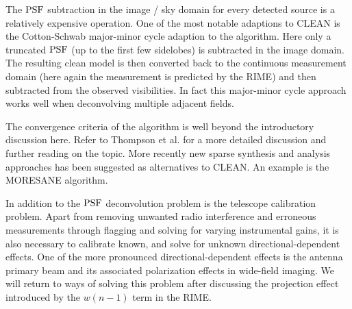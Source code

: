 The $\textrm{PSF}$ subtraction in the image / sky domain for every detected source is a relatively expensive operation. One of the
most notable adaptions to CLEAN is the Cotton-Schwab major-minor cycle adaption to the algorithm. Here only a truncated
$\textrm{PSF}$ (up to the first few sidelobes) is subtracted in the image domain. The resulting clean model is then converted back
to the continuous measurement domain (here again the measurement is predicted by the RIME) and then subtracted from the 
observed visibilities. In fact this major-minor cycle approach works well when deconvolving multiple adjacent fields. 

The convergence criteria of the algorithm is well beyond the introductory discussion here. Refer to Thompson et 
al. \cite[ch 11]{thompson2008interferometry} for a more detailed discussion and further reading on the topic. More
recently new sparse synthesis and analysis approaches has been suggested as alternatives to CLEAN. An example is the 
MORESANE \cite{dabbech2015moresane} algorithm.

In addition to the $\textrm{PSF}$ deconvolution problem is the telescope calibration problem. Apart from removing unwanted
radio interference and erroneous measurements through flagging and solving for varying instrumental gains, it is also
necessary to calibrate known, and solve for unknown directional-dependent effects. One of the more pronounced directional-dependent 
effects is the antenna primary beam and its associated polarization effects in wide-field imaging. We will return
to ways of solving this problem after discussing the projection effect introduced by the $w(n-1)$ term in the RIME.

